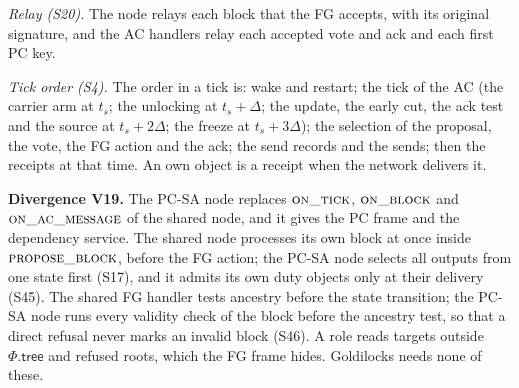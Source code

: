 \documentclass{article}
\newcommand{\Fr}{\Phi}
\newcommand{\tree}{\mathsf{tree}}
\newcommand{\PCdiv}[2]{\par\noindent\textbf{Divergence #1.} #2\par}
\begin{document}
\emph{Relay (S20).}  The node relays each block that the FG accepts, with
its original signature, and the AC handlers relay each accepted vote and
ack and each first PC key.

\emph{Tick order (S4).}  The order in a tick is: wake and restart; the
tick of the AC (the carrier arm at $t_s$; the unlocking at $t_s+\Delta$; the
update, the early cut, the ack test and the source at $t_s+2\Delta$; the
freeze at $t_s+3\Delta$); the selection of the proposal, the vote, the FG
action and the ack; the send records and the sends; then the receipts
at that time.  An own object is a receipt when the network delivers it.

\PCdiv{V19}{The PC-SA node replaces $\Call{on\_tick}{}$,
$\Call{on\_block}{}$ and $\Call{on\_ac\_message}{}$ of the shared node,
and it gives the PC frame and the dependency service.  The shared node
processes its own block at once inside $\Call{propose\_block}{}$, before
the FG action; the PC-SA node selects all outputs from one state first
(S17), and it admits its own duty objects only at their delivery (S45).
The shared FG handler tests ancestry before the state transition; the
PC-SA node runs every validity check of the block before the ancestry
test, so that a direct refusal never marks an invalid block (S46).  A role reads targets outside $\Fr.\tree$ and refused roots, which
the FG frame hides.  Goldilocks needs none of these.}
\end{document}
